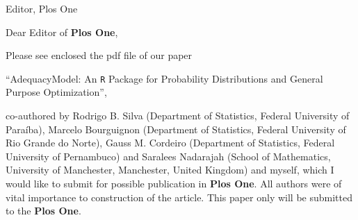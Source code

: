 \documentclass[a4paper, 10pt]{letter}
\begin{document}
\baselineskip 15pt
\parskip 12pt

\signature{\centering PhD Pedro R. D. Marinho}
\date{\today}

\begin{letter}{Editor, Plos One}


Dear Editor of \textbf{Plos One},


Please see enclosed the pdf file of our paper

``AdequacyModel: An \texttt{R} Package for Probability Distributions and General Purpose Optimization'',

co-authored by Rodrigo B. Silva (Department of Statistics, Federal University of Para\'{i}ba), Marcelo Bourguignon (Department of Statistics, Federal University of Rio Grande do Norte), Gauss M. Cordeiro (Department of Statistics, Federal University of Pernambuco) and Saralees Nadarajah (School of Mathematics, University of Manchester, Manchester, United Kingdom) and myself, which I would like to submit for possible publication in \textbf{Plos One}. All authors were of vital importance to construction of the article. This paper only will be submitted to the \textbf{Plos One}.

%
%


\end{letter}
\end{document}
